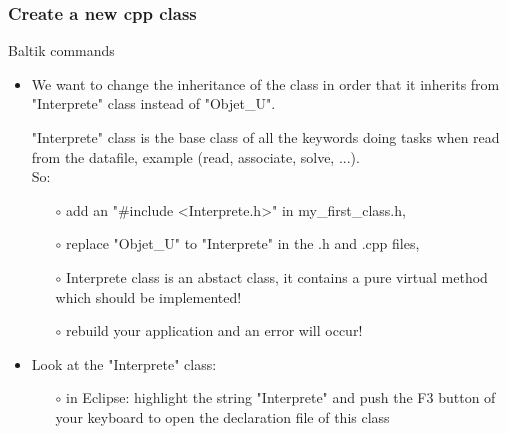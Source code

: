 \documentclass[10pt, hyperref={unicode=true,pdfusetitle, bookmarks=true,bookmarksnumbered=false,bookmarksopen=false, breaklinks=false,pdfborder={0 0 1},backref=true,colorlinks=true,linkcolor=darkblue,pageanchor, urlcolor=darkblue}]{beamer}
\begin{document}
\begin{frame}
\frametitle{Create a new cpp class}
\begin{block}{Baltik commands}

\begin{itemize}
\item We want to change the inheritance of the class in order that it inherits from "Interprete" class
instead of "Objet\_U".

"Interprete" class is the base class of all the keywords doing tasks when read from the datafile, example (read, associate, solve, ...).\\
\vspace{0.1cm}
So:
    \begin{itemize}
    \item [$\circ$] add an "\#include <Interprete.h>" in my\_first\_class.h,
    \item [$\circ$] replace "Objet\_U" to "Interprete" in the .h and .cpp files,
    \item [$\circ$] Interprete class is an abstact class, it contains a pure virtual method which should be implemented!\\
    \item [$\circ$] rebuild your application and an error will occur!
    \end{itemize}

\item Look at the "Interprete" class:
    \begin{itemize}
    \item [$\circ$] in Eclipse: highlight the string "Interprete" and push the F3 button of your keyboard to open the declaration file of this class
    \end{itemize}
\end{itemize}

\end{block}
\end{frame}
\end{document}
